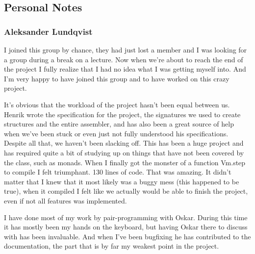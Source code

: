 \subsection{Personal Notes}

\subsubsection{Aleksander Lundqvist}
I joined this group by chance, they had just lost a member and I was looking for 
a group during a break on a lecture. Now when we're about to reach the end of 
the project I fully realize that I had no idea what I was getting myself into.
And I'm very happy to have joined this group and to have worked on this crazy project.

It's obvious that the workload of the project hasn't been equal between us. 
Henrik wrote the specification for the project, the signatures we used to 
create structures and the entire assembler, and has also been a great source 
of help when we've been stuck or even just not fully understood his specifications. 
Despite all that, we haven't been slacking off. This has been a huge project and has
required quite a bit of studying up on things that have not been covered by the class,
such as monads. When I finally got the monster of a function Vm.step to compile 
I felt triumphant. 130 lines of code. That was amazing. It didn't matter that I 
knew that it most likely was a buggy mess (this happened to be true), when it 
compiled I felt like we actually would be able to finish the project, even if 
not all features was implemented.

I have done most of my work by pair-programming with Oskar.
During this time it has mostly been my hands on the keyboard, 
but having Oskar there to discuss with has been invaluable. 
And when I've been bugfixing he has contributed to the documentation, 
the part that is by far my weakest point in the project. 